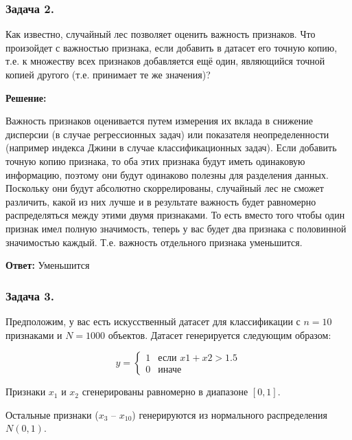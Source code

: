 \subsubsection*{Задача 2.} 

Как известно, случайный лес позволяет оценить важность признаков. Что произойдет с важностью признака, если добавить в датасет его точную копию, т.е. к множеству всех признаков добавляется ещё один, являющийся точной копией другого (т.е. принимает те же значения)?

\textbf{Решение:}

Важность признаков оценивается путем измерения их вклада в снижение дисперсии (в случае регрессионных задач) или показателя неопределенности (например индекса Джини в случае классификационных задач). Если добавить точную копию признака, то оба этих признака будут иметь одинаковую информацию, поэтому они будут одинаково полезны для разделения данных. Поскольку они будут абсолютно скоррелированы, случайный лес не сможет различить, какой из них лучше и в результате важность будет равномерно распределяться между этими двумя признаками. То есть вместо того чтобы один признак имел полную значимость, теперь у вас будет два признака с половинной значимостью каждый. Т.е. важность отдельного признака уменьшится.


\textbf{Ответ:} Уменьшится

\subsubsection*{Задача 3.}

Предположим, у вас есть искусственный датасет для классификации с $n = 10$ признаками и $N = 1000$ объектов. Датасет генерируется следующим образом:

$$
y = \begin{cases}
1 & \text{если } x1 + x2 > 1.5 \\
0 & \text{иначе}
\end{cases}
$$

Признаки $x_1$ и $x_2$ сгенерированы равномерно в диапазоне $[0, 1]$.

Остальные признаки ($x_3$ – $x_{10}$) генерируются из нормального распределения $N(0, 1)$.

